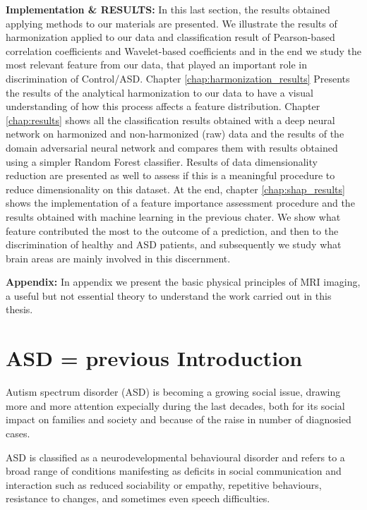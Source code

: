 \documentclass[11pt]{report}
\begin{document}
\textbf{Implementation \& RESULTS:} In this last section, the results obtained applying methods to our materials are presented. We illustrate the results of harmonization applied to our data and classification result of Pearson-based correlation coefficients and Wavelet-based coefficients and in the end we study the most relevant feature from our data, that played an important role in discrimination of Control/ASD.
Chapter \ref{chap:harmonization_results} Presents the results of the analytical harmonization to our data to have a visual understanding of how this process affects a feature distribution.
Chapter \ref{chap:results} shows all the classification results obtained with a deep neural network on harmonized and non-harmonized (raw) data and the results of the domain adversarial neural network and compares them with results obtained using a simpler Random Forest classifier. Results of data dimensionality reduction are presented as well to assess if this is a meaningful procedure to reduce dimensionality on this dataset.
At the end, chapter \ref{chap:shap_results} shows the implementation of a feature importance assessment procedure and the results obtained with machine learning in the previous chater. We show what feature contributed the most to the outcome of a prediction, and then to the discrimination of healthy and ASD patients, and subsequently we study what brain areas are mainly involved in this discernment.


\textbf{Appendix:} In appendix we present the basic physical principles of MRI imaging, a useful but not essential theory to understand the work carried out in this thesis.



\chapter{ASD = previous Introduction}\label{chap:autism}

Autism spectrum disorder (ASD) is becoming a growing social issue, drawing more and more attention expecially during the last decades, both for its social impact on families and society and because of the raise in number of diagnosied cases.

ASD is classified as a neurodevelopmental behavioural disorder \cite{guze-1995} \cite{who-1993} and refers to a broad range of conditions manifesting as deficits in social communication and interaction such as reduced sociability or empathy, repetitive behaviours, resistance to changes, and sometimes even speech difficulties.\cite{rapin-2008}
\end{document}
